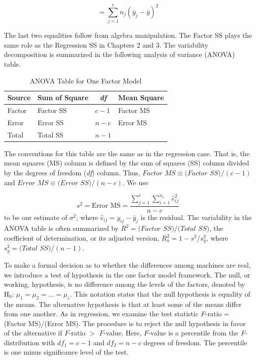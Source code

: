 \begin{equation*}
=\sum_{j=1}^{c}n_{j}(\bar{y}_{j}-\bar{y})^{2}
\end{equation*}

The last two equalities follow from algebra manipulation. The Factor
SS plays the same role as the Regression SS in Chapters 2 and 3. The
variability decomposition is summarized in the following analysis of
variance (ANOVA) table.

  \begin{center}  \begin{table}[h]
\caption{\label{T4:ANOVAOneFactor} ANOVA Table for One Factor Model}
\begin{tabular}{cccc}
\hline
Source & Sum of Square & \textit{df} & Mean Square \\ \hline
\multicolumn{1}{l}{Factor} & \multicolumn{1}{l}{Factor SS} &
\multicolumn{1}{l}{$c-1$} & \multicolumn{1}{l}{Factor MS} \\
\multicolumn{1}{l}{Error} & \multicolumn{1}{l}{Error SS} &
\multicolumn{1}{l}{$n-c$} & \multicolumn{1}{l}{Error MS} \\
\multicolumn{1}{l}{Total} & \multicolumn{1}{l}{Total SS} &
\multicolumn{1}{l}{$n-1$} & \multicolumn{1}{l}{} \\ \hline
\end{tabular}

\end{table}  \end{center}  

The conventions for this table are the same as in the regression case. That
is, the mean squares (MS) column is defined by the sum of squares (SS)
column divided by the degrees of freedom (\textit{df}) column. Thus, $Factor$
$MS\equiv (Factor$ $SS)/(c-1)$ and $Error$ $MS\equiv (Error$ $SS)/(n-c)$. We
use

\begin{equation*}
s^{2}=\text{Error MS}=\frac{\sum_{j=1}^{c}\sum_{i=1}^{n_{j}}\hat{e}_{ij}^{2}%
}{n-c}
\end{equation*}%
to be our estimate of $\sigma ^{2}$, where $\hat{e}_{ij}=y_{ij}-\bar{y}_{j}$
is the residual. The variability in the ANOVA table is often summarized by $%
R^{2}=(Factor$ $SS)/(Total$ $SS)$, the coefficient of determination, or its
adjusted version, $R_a^{2}=1-s^{2}/s_{y}^{2}$, where $s_{y}^{2}=(Total$ $%
SS)/(n-1)$.


To make a formal decision as to whether the differences among
machines are real, we introduce a test of hypothesis in the one
factor model framework. The null, or working, hypothesis, is no
difference among the levels of the factors, denoted by H$_0$: $\mu
_1=\mu_2=\ldots =\mu_c$. This notation states that the null
hypothesis is equality of the means. The alternative hypothesis is
that at least some of the means differ from one another. As in
regression, we examine the test statistic \textit{F}-ratio = (Factor
MS)/(Error MS). The procedure is to reject the null hypothesis in
favor of the alternative if $F$-ratio $>$ $F$-value. Here, $F$-value
is a percentile from the \textit{F}-distribution with $df_1=c-1$ and
$df_2=n-c$ degrees of freedom. The percentile is one minus
significance level of the test.

